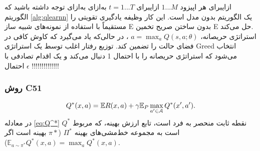 ‌ازای{برای هر اپیزود 
$1...M$}
‌ازای{برای $t=1...T$}
  ‌به‌ازای
‌به‌ازای
\label{alg:qlearnn}
توجه داشته باشید که الگوریتم \ref{alg:qlearnn} یک الگوریتم بدون مدل است. این کار وظیفه یادگیری تقویتی را مستقیماً با استفاده از نمونه‌های شبیه ساز E بدون ساختن صریح تخمین E حل می‌کند.
\\ استراتژی حریصانه، 
 $a = \max_{a} Q(s, a; \theta)$
 ، در حالی‌که یاد می‌گیرد که
کاوش کافی در فضای حالت را تضمین کند. توزیع رفتار اغلب توسط یک استراتژی Greed انتخاب می‌شود که استراتژی حریصانه را با احتمال 1 دنبال می‌کند و یک
اقدام تصادفی با احتمال $\epsilon$
!!!!!!!!!!!!!!
\subsubsection{روش C51 }
\begin{align}
Q^*(x,a)= \mathbb{E} R(x,a)+\gamma \mathbb{E}_P \max_{a' \in \EuScript{A}} Q^* (x',a').
\label{eq:Q^*}
\end{align}
در معادله \ref{eq:Q^*} $Q^*$ نقطه ثابت منحصر به فرد است، تابع ارزش بهینه، که مربوط است به مجموعه خط‌مشی‌های بهینه 
$\Pi^*$
($\pi*$ بهینه است اگر
$\mathbb{E}_{a\sim \pi^*} Q^*(x,a) = \max_{a}Q^*(x,a).$)

